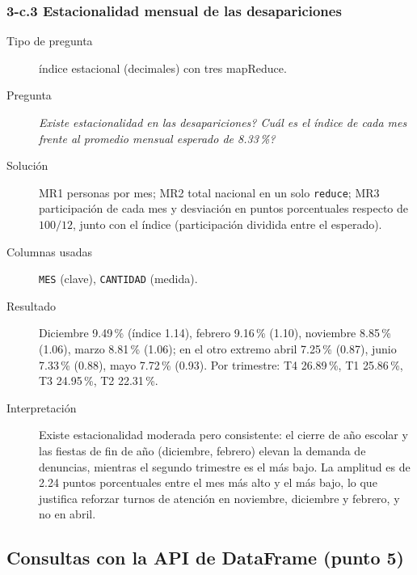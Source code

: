 \subsubsection*{3-c.3 \textbar{} Estacionalidad mensual de las desapariciones}
\begin{description}
\item[Tipo de pregunta] \'indice estacional (decimales) con tres mapReduce.
\item[Pregunta] \emph{Existe estacionalidad en las desapariciones? Cu\'al es el \'indice de cada
      mes frente al promedio mensual esperado de 8.33\,\%?}
\item[Soluci\'on] MR1 personas por mes; MR2 total nacional en un solo \texttt{reduce}; MR3
      participaci\'on de cada mes y desviaci\'on en puntos porcentuales respecto de $100/12$,
      junto con el \'indice (participaci\'on dividida entre el esperado).
\item[Columnas usadas] \texttt{MES} (clave), \texttt{CANTIDAD} (medida).
\item[Resultado] Diciembre 9.49\,\% (\'indice 1.14), febrero 9.16\,\% (1.10), noviembre 8.85\,\%
      (1.06), marzo 8.81\,\% (1.06); en el otro extremo abril 7.25\,\% (0.87), junio 7.33\,\%
      (0.88), mayo 7.72\,\% (0.93). Por trimestre: T4 26.89\,\%, T1 25.86\,\%, T3 24.95\,\%,
      T2 22.31\,\%.
\item[Interpretaci\'on] Existe estacionalidad moderada pero consistente: el cierre de a\~no
      escolar y las fiestas de fin de a\~no (diciembre, febrero) elevan la demanda de denuncias,
      mientras el segundo trimestre es el m\'as bajo. La amplitud es de 2.24 puntos porcentuales
      entre el mes m\'as alto y el m\'as bajo, lo que justifica reforzar turnos de atenci\'on en
      noviembre, diciembre y febrero, y no en abril.
\end{description}

\subsection{Consultas con la API de DataFrame (punto 5)}

